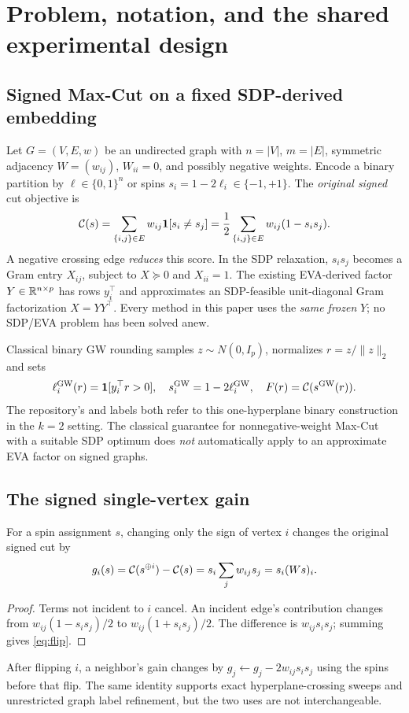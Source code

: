 \section{Problem, notation, and the shared experimental design}\label{sec:problem}
\subsection{Signed Max-Cut on a fixed SDP-derived embedding}
Let $G=(V,E,w)$ be an undirected graph with $n=|V|$, $m=|E|$,
symmetric adjacency $W=(w_{ij})$, $W_{ii}=0$, and possibly negative
weights. Encode a binary partition by $\ell\in\{0,1\}^n$ or spins
$s_i=1-2\ell_i\in\{-1,+1\}$. The \emph{original signed} cut objective is
\begin{equation}\label{eq:cut}
\mathcal{C}(s)=\sum_{\{i,j\}\in E}w_{ij}\mathbf{1}[s_i\ne s_j]
=\frac12\sum_{\{i,j\}\in E}w_{ij}(1-s_i s_j).
\end{equation}
A negative crossing edge \emph{reduces} this score.
In the SDP relaxation, $s_i s_j$ becomes a Gram entry $X_{ij}$,
subject to $X\succeq0$ and $X_{ii}=1$. The existing EVA-derived
factor $Y\in\mathbb{R}^{n\times p}$ has rows $y_i^\top$ and approximates
an SDP-feasible unit-diagonal Gram factorization $X=YY^\top$.
Every method in this paper uses the \emph{same frozen} $Y$;
no SDP/EVA problem has been solved anew.

Classical binary GW rounding samples $z\sim N(0,I_p)$,
normalizes $r=z/\|z\|_2$ and sets
\begin{equation}\label{eq:gw}
\ell_i^{\mathrm{GW}}(r)=\mathbf{1}[y_i^\top r>0],\quad
s_i^{\mathrm{GW}}=1-2\ell_i^{\mathrm{GW}},\quad
F(r)=\mathcal{C}(s^{\mathrm{GW}}(r)).
\end{equation}
The repository's  and  labels both refer
to this one-hyperplane binary construction in the $k=2$ setting.
The classical guarantee for nonnegative-weight Max-Cut with a
suitable SDP optimum \citep{goemans1995} does \emph{not}
automatically apply to an approximate EVA factor on signed graphs.

\subsection{The signed single-vertex gain}
\begin{lemma}\label{lem:flip}
For a spin assignment $s$, changing only the sign of vertex $i$
changes the original signed cut by
\begin{equation}\label{eq:flip}
g_i(s)=\mathcal{C}(s^{\oplus i})-\mathcal{C}(s)
=s_i\sum_j w_{ij}s_j=s_i(Ws)_i.
\end{equation}
\end{lemma}
\begin{proof}
Terms not incident to $i$ cancel. An incident edge's contribution
changes from $w_{ij}(1-s_i s_j)/2$ to
$w_{ij}(1+s_i s_j)/2$. The difference is $w_{ij}s_i s_j$;
summing gives \eqref{eq:flip}.
\end{proof}
After flipping $i$, a neighbor's gain changes by
$g_j\gets g_j-2w_{ij}s_i s_j$ using the spins before that flip.
The same identity supports exact hyperplane-crossing sweeps and
unrestricted graph label refinement, but the two uses are not
interchangeable.

